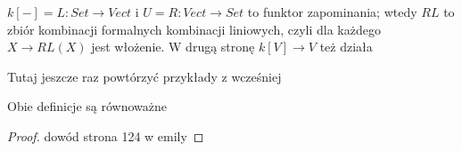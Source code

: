 $k[-]=L:Set\to Vect$ i $U=R:Vect\to Set$ to funktor zapominania; wtedy $RL$ to zbiór kombinacji formalnych kombinacji liniowych, czyli dla każdego $X\to RL(X)$ jest włożenie. W drugą stronę $k[V]\to V$ też działa

Tutaj jeszcze raz powtórzyć przykłady z wcześniej


\begin{theorem}{}{}
  Obie definicje są równoważne
\end{theorem}

\begin{proof}
  dowód strona 124 w emily
\end{proof}



